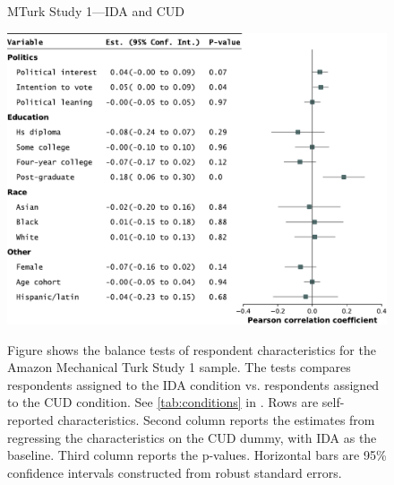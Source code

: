\begin{center}
	\begin{figure}[H]
		\centering
		\caption{MTurk Study 1---IDA and CUD}
		\includegraphics[width=\textwidth]{../figs/study1-baltest-RW-ips.pdf}
		\label{fig:baltest-RW-ips}
		\caption*{\footnotesize 
			Figure shows the balance tests of respondent characteristics for the Amazon Mechanical Turk Study 1 sample.
			The tests compares respondents assigned to the IDA condition vs. respondents assigned to the CUD condition.
			See \cref{tab:conditions} in .
			Rows are self-reported characteristics.
			Second column reports the estimates from regressing the characteristics on the CUD dummy, with IDA as the baseline.
			Third column reports the p-values.
			Horizontal bars are 95\% confidence intervals constructed from robust standard errors.
		}
	\end{figure}
\end{center}

